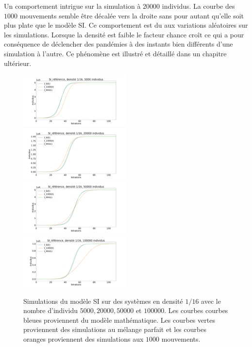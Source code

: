 Un comportement intrigue sur la simulation à $20000$ individus. La courbe des $1000$ mouvements semble être décalée vers la droite sans pour autant qu'elle soit plus plate que le modèle SI. Ce comportement est du aux variations aléatoires sur les simulations. Lorsque la densité est faible le facteur chance croît ce qui a pour conséquence de déclencher des pandémies à des instants bien différents d'une simulation à l'autre. Ce phénomène est illustré et détaillé dans un chapitre ultérieur.

\newpage

\begin{figure}
    \centering
    \captionsetup{justification=centering}
    \includegraphics[width=0.5\textwidth]{Images/SI_ref_16_5k.pdf}
    \includegraphics[width=0.5\textwidth]{Images/SI_ref_16_20k.pdf}
    \includegraphics[width=0.5\textwidth]{Images/SI_ref_16_50k.pdf}
    \includegraphics[width=0.5\textwidth]{Images/SI_ref_16_100k.pdf}
    \caption[Simulations de SI, densité 1/16]{Simulations du modèle SI sur des systèmes en densité $1/16$ avec le nombre d'individu $5000,20000,50000$ et $100000$. Les courbes courbes bleues proviennent du modèle mathématique. Les courbes vertes proviennent des simulations au mélange parfait et les courbes oranges proviennent des simulations aux $1000$ mouvements.}
\end{figure}

